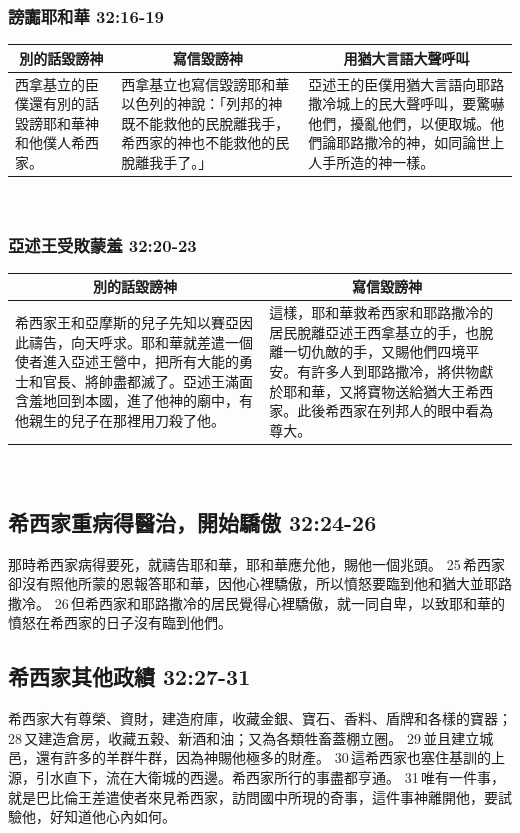 \subsubsection{謗讟耶和華 32:16-19}
\begin{table}[H]
\centering
\begin{tabular}{p{3.2cm}|p{6.25cm}|p{7.5cm}}\hline\hline
\multicolumn{1}{c|}{別的話毀謗神}&\multicolumn{1}{c|}{寫信毀謗神}&\multicolumn{1}{c}{用猶大言語大聲呼叫}\\\hline
西拿基立的臣僕還有別的話毀謗耶和華神和他僕人希西家。
&西拿基立也寫信毀謗耶和華以色列的神說：「列邦的神既不能救他的民脫離我手，希西家的神也不能救他的民脫離我手了。」
&亞述王的臣僕用猶大言語向耶路撒冷城上的民大聲呼叫，要驚嚇他們，擾亂他們，以便取城。他們論耶路撒冷的神，如同論世上人手所造的神一樣。\\\hline 
\end{tabular}
\end{table} 

\subsubsection{亞述王受敗蒙羞 32:20-23}
\begin{table}[H]
\centering
\begin{tabular}{p{8.75cm}|p{8.5cm}}\hline\hline
\multicolumn{1}{c|}{別的話毀謗神}&\multicolumn{1}{c}{寫信毀謗神}\\\hline
希西家王和亞摩斯的兒子先知以賽亞因此禱告，向天呼求。耶和華就差遣一個使者進入亞述王營中，把所有大能的勇士和官長、將帥盡都滅了。亞述王滿面含羞地回到本國，進了他神的廟中，有他親生的兒子在那裡用刀殺了他。
&這樣，耶和華救希西家和耶路撒冷的居民脫離亞述王西拿基立的手，也脫離一切仇敵的手，又賜他們四境平安。有許多人到耶路撒冷，將供物獻於耶和華，又將寶物送給猶大王希西家。此後希西家在列邦人的眼中看為尊大。
\\\hline 
\end{tabular}
\end{table} 


\subsection{希西家重病得醫治，開始驕傲 32:24-26}
那時希西家病得要死，就禱告耶和華，耶和華應允他，賜他一個兆頭。 25 希西家卻沒有照他所蒙的恩報答耶和華，因他心裡驕傲，所以憤怒要臨到他和猶大並耶路撒冷。 26 但希西家和耶路撒冷的居民覺得心裡驕傲，就一同自卑，以致耶和華的憤怒在希西家的日子沒有臨到他們。

\subsection{希西家其他政績 32:27-31}
希西家大有尊榮、資財，建造府庫，收藏金銀、寶石、香料、盾牌和各樣的寶器； 28 又建造倉房，收藏五穀、新酒和油；又為各類牲畜蓋棚立圈。 29 並且建立城邑，還有許多的羊群牛群，因為神賜他極多的財產。 30 這希西家也塞住基訓的上源，引水直下，流在大衛城的西邊。希西家所行的事盡都亨通。 31 唯有一件事，就是巴比倫王差遣使者來見希西家，訪問國中所現的奇事，這件事神離開他，要試驗他，好知道他心內如何。

